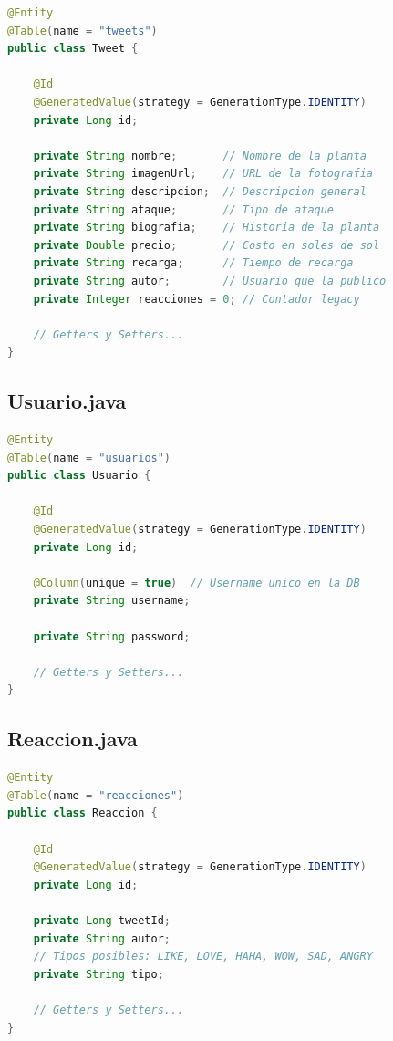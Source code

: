 \documentclass[12pt,a4paper]{article}
\begin{document}
\begin{lstlisting}[style=javastyle, language=Java, caption=Entidad Tweet con todos los campos de la planta]
@Entity
@Table(name = "tweets")
public class Tweet {

    @Id
    @GeneratedValue(strategy = GenerationType.IDENTITY)
    private Long id;

    private String nombre;       // Nombre de la planta
    private String imagenUrl;    // URL de la fotografia
    private String descripcion;  // Descripcion general
    private String ataque;       // Tipo de ataque
    private String biografia;    // Historia de la planta
    private Double precio;       // Costo en soles de sol
    private String recarga;      // Tiempo de recarga
    private String autor;        // Usuario que la publico
    private Integer reacciones = 0; // Contador legacy

    // Getters y Setters...
}
\end{lstlisting}

\subsection{Usuario.java}

\begin{lstlisting}[style=javastyle, language=Java, caption=Entidad Usuario]
@Entity
@Table(name = "usuarios")
public class Usuario {

    @Id
    @GeneratedValue(strategy = GenerationType.IDENTITY)
    private Long id;

    @Column(unique = true)  // Username unico en la DB
    private String username;

    private String password;

    // Getters y Setters...
}
\end{lstlisting}

\subsection{Reaccion.java}

\begin{lstlisting}[style=javastyle, language=Java, caption=Entidad Reaccion con tipo emoji]
@Entity
@Table(name = "reacciones")
public class Reaccion {

    @Id
    @GeneratedValue(strategy = GenerationType.IDENTITY)
    private Long id;

    private Long tweetId;
    private String autor;
    // Tipos posibles: LIKE, LOVE, HAHA, WOW, SAD, ANGRY
    private String tipo;

    // Getters y Setters...
}
\end{lstlisting}
\end{document}
